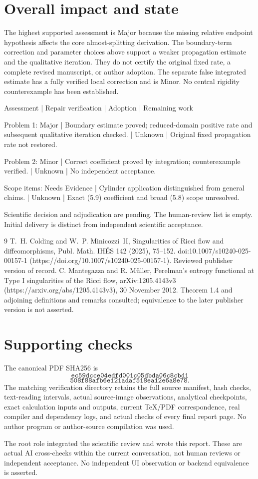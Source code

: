 \documentclass[10pt]{article}
\begin{document}
\section*{Overall impact and state}
The highest supported assessment is Major because the missing relative endpoint hypothesis affects the core almost-splitting derivation. The boundary-term correction and parameter choices above support a weaker propagation estimate and the qualitative iteration. They do not certify the original fixed rate, a complete revised manuscript, or author adoption. The separate false integrated estimate has a fully verified local correction and is Minor. No central rigidity counterexample has been established.\par
Assessment | Repair verification | Adoption | Remaining work\par
Problem 1: Major | Boundary estimate proved; reduced-domain positive rate and subsequent qualitative iteration checked. | Unknown | Original fixed propagation rate not restored.\par
Problem 2: Minor | Correct coefficient proved by integration; counterexample verified. | Unknown | No independent acceptance.\par
Scope items: Needs Evidence | Cylinder application distinguished from general claims. | Unknown | Exact (5.9) coefficient and broad (5.8) scope unresolved.\par
Scientific decision and adjudication are pending. The human-review list is empty. Initial delivery is distinct from independent scientific acceptance.\par
9 T. H. Colding and W. P. Minicozzi II, Singularities of Ricci flow and diffeomorphisms, Publ. Math. IHÉS 142 (2025), 75–152. doi:10.1007/s10240-025-00157-1 (https://doi.org/10.1007/s10240-025-00157-1). Reviewed publisher version of record. C. Mantegazza and R. Müller, Perelman’s entropy functional at Type I singularities of the Ricci flow, arXiv:1205.4143v3 (https://arxiv.org/abs/1205.4143v3), 30 November 2012. Theorem 1.4 and adjoining definitions and remarks consulted; equivalence to the later publisher version is not asserted.\par
\section*{Supporting checks}
The canonical PDF SHA256 is \[\texttt{ec59dcce04edfd001c05dbda06c8cbd1}\] \[\texttt{508f88afb6e121adaf518ea12e6a8e78}.\] The matching verification directory retains the full source manifest, hash checks, text-reading intervals, actual source-image observations, analytical checkpoints, exact calculation inputs and outputs, current TeX/PDF correspondence, real compiler and dependency logs, and actual checks of every final report page. No author program or author-source compilation was used.\par
The root role integrated the scientific review and wrote this report. These are actual AI cross-checks within the current conversation, not human reviews or independent acceptance. No independent UI observation or backend equivalence is asserted.\par
\end{document}

